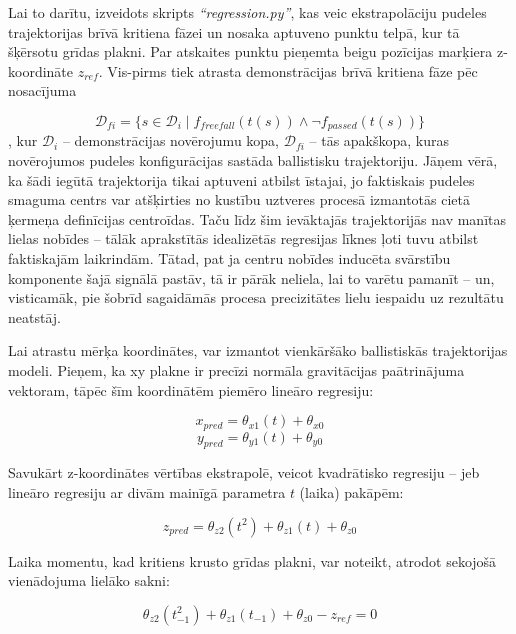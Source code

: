 \documentclass[12pt, a4paper]{article}
\numberwithin{equation}{section} %
\begin{document}
Lai to darītu, izveidots skripts \textit{``regression.py''}, kas veic ekstrapolāciju pudeles trajektorijas brīvā kritiena fāzei un nosaka aptuveno punktu telpā, kur tā šķērsotu grīdas plakni. Par atskaites punktu pieņemta beigu pozīcijas marķiera z-koordināte $z_{ref}$. Vis-pirms tiek atrasta demonstrācijas brīvā kritiena fāze pēc nosacījuma


\begin{equation}
    \mathcal{D}_{fi} = \lbrace s \in \mathcal{D}_i \mid f_{freefall}(t(s)) \land \lnot f_{passed}(t(s)) \rbrace
\end{equation}
, kur $\mathcal{D}_i$ -- demonstrācijas novērojumu kopa, $\mathcal{D}_{fi}$ -- tās apakškopa, kuras novērojumos pudeles konfigurācijas sastāda ballistisku trajektoriju. Jāņem vērā, ka šādi iegūtā trajektorija tikai aptuveni atbilst īstajai, jo faktiskais pudeles smaguma centrs var atšķirties no kustību uztveres procesā izmantotās cietā ķermeņa definīcijas centroīdas. Taču līdz šim ievāktajās trajektorijās nav manītas lielas nobīdes -- tālāk aprakstītās idealizētās regresijas līknes ļoti tuvu atbilst faktiskajām laikrindām. Tātad, pat ja centru nobīdes inducēta svārstību komponente šajā signālā pastāv, tā ir pārāk neliela, lai to varētu pamanīt -- un, visticamāk, pie šobrīd sagaidāmās procesa precizitātes lielu iespaidu uz rezultātu neatstāj.

Lai atrastu mērķa koordinātes, var izmantot vienkāršāko ballistiskās trajektorijas modeli. Pieņem, ka xy plakne ir precīzi normāla gravitācijas paātrinājuma vektoram, tāpēc šīm koordinātēm piemēro lineāro regresiju:


\begin{equation}
    x_{pred} = \theta_{x1}(t) + \theta_{x0}
\end{equation}
\begin{equation}
    y_{pred} = \theta_{y1}(t) + \theta_{y0}
\end{equation}

Savukārt z-koordinātes vērtības ekstrapolē, veicot kvadrātisko regresiju -- jeb lineāro regresiju ar divām mainīgā parametra $t$ (laika) pakāpēm:

\begin{equation}
    z_{pred} = \theta_{z2}(t^2) + \theta_{z1}(t) + \theta_{z0}
\end{equation}

Laika momentu, kad kritiens krusto grīdas plakni, var noteikt,  atrodot sekojošā vienādojuma lielāko sakni:

\begin{equation}
    \theta_{z2}(t_{-1}^2) + \theta_{z1}(t_{-1}) + \theta_{z0} - z_{ref} = 0
\end{equation}
\end{document}
